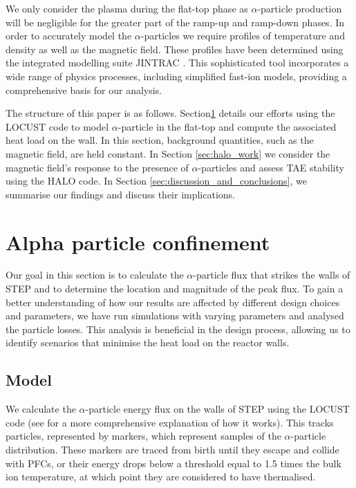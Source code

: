 \documentclass[10pt, a4paper, twoside]{article}
\begin{document}
We only consider the plasma during the flat-top phase as $\alpha$-particle production will be negligible for the greater part of the ramp-up and ramp-down phases. In order to accurately model the $\alpha$-particles we require profiles of temperature and density as well as the magnetic field. These profiles have been determined using the integrated modelling suite JINTRAC \cite{meyer2023, mitchell2023}. This sophisticated tool incorporates a wide range of physics processes, including simplified fast-ion models, providing a comprehensive basis for our analysis.

The structure of this paper is as follows. Section\ref{sec:locust_work} details our efforts using the LOCUST code to model $\alpha$-particle in the flat-top and compute the associated heat load on the wall. In this section, background quantities, such as the magnetic field, are held constant. In Section \ref{sec:halo_work} we consider the magnetic field's response to the presence of $\alpha$-particles and assess TAE stability using the HALO code. In Section \ref{sec:discussion_and_conclusions}, we summarise our findings and discuss their implications.

\section{Alpha particle confinement}
\label{sec:locust_work}

Our goal in this section is to calculate the $\alpha$-particle flux that strikes the walls of STEP and to determine the location and magnitude of the peak flux. To gain a better understanding of how our results are affected by different design choices and parameters, we have run simulations with varying parameters and analysed the particle losses. This analysis is beneficial in the design process, allowing us to identify scenarios that minimise the heat load on the reactor walls.

\subsection{Model}

We calculate the $\alpha$-particle energy flux on the walls of STEP using the LOCUST code (see \cite{akers2018, ward2021} for a more comprehensive explanation of how it works). This tracks particles, represented by markers, which represent samples of the $\alpha$-particle distribution. These markers are traced from birth until they escape and collide with PFCs, or their energy drops below a threshold equal to 1.5 times the bulk ion temperature, at which point they are considered to have thermalised.
\end{document}
